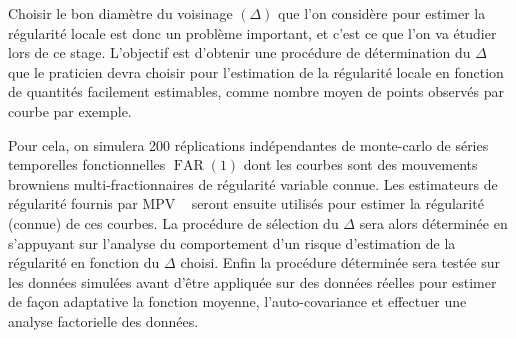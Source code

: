 Choisir le bon diamètre du voisinage $(\Delta)$ que l'on considère pour estimer la régularité locale est donc un problème important, et c'est ce que l'on va étudier lors de ce stage. L'objectif est d'obtenir une procédure de détermination du $\Delta$ que le praticien devra choisir pour l'estimation de la régularité locale en fonction de quantités facilement estimables, comme nombre moyen de points observés par courbe par exemple.

Pour cela, on simulera 200 réplications indépendantes de monte-carlo de séries temporelles fonctionnelles $\operatorname{FAR}(1)$ dont les courbes sont des mouvements browniens multi-fractionnaires de régularité variable connue. Les estimateurs de régularité fournis par MPV ~\cite{maissoro-SmoothnessFTSweakDep} seront ensuite utilisés pour estimer la régularité (connue) de ces courbes. La procédure de sélection du $\Delta$ sera alors déterminée en s'appuyant sur l'analyse du comportement d'un risque d'estimation de la régularité en fonction du $\Delta$ choisi. Enfin la procédure déterminée sera testée sur les données simulées avant d'être appliquée sur des données réelles pour estimer de façon adaptative la fonction moyenne, l'auto-covariance et effectuer une analyse factorielle des données.